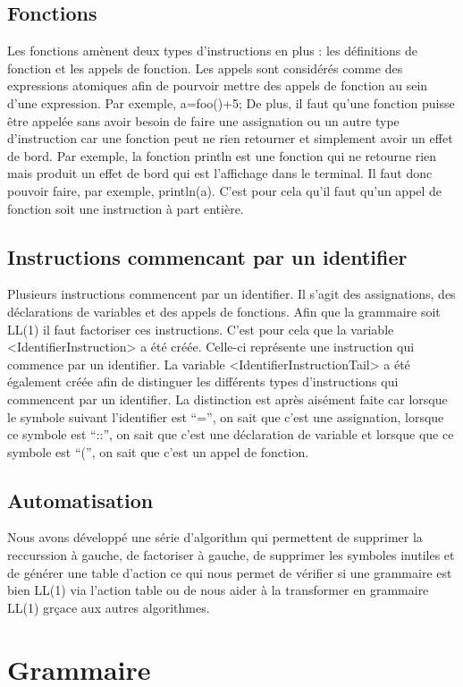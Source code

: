 \documentclass[a4paper,10pt]{article}
\begin{document}
\subsection{Fonctions}
Les fonctions amènent deux types d'instructions en plus : les définitions de fonction et les appels de fonction. Les appels sont considérés comme des expressions atomiques afin de pourvoir mettre des appels de fonction au sein d'une expression. Par exemple, a=foo()+5;
De plus, il faut qu'une fonction puisse être appelée sans avoir besoin de faire une assignation ou un autre type d'instruction car une fonction peut ne rien retourner et simplement avoir un effet de bord. Par exemple, la fonction println est une fonction qui ne retourne rien mais produit un effet de bord qui est l'affichage dans le terminal. Il faut donc pouvoir faire, par exemple, println(a). C'est pour cela qu'il faut qu'un appel de fonction soit une instruction à part entière.
\subsection{Instructions commencant par un identifier}
Plusieurs instructions commencent par un identifier. Il s'agit des assignations, des déclarations de variables et des appels de fonctions. Afin que la grammaire soit LL(1) il faut factoriser ces instructions. C'est pour cela que la variable <IdentifierInstruction> a été créée. Celle-ci représente une instruction qui commence par un identifier. La variable <IdentifierInstructionTail> a été également créée afin de distinguer les différents types d'instructions qui commencent par un identifier. La distinction est après aisément faite car lorsque le symbole suivant l'identifier est ``='', on sait que c'est une assignation, lorsque ce symbole est ``::'', on sait que c'est une déclaration de variable et lorsque que ce symbole est ``('', on sait que c'est un appel de fonction.
\subsection{Automatisation}
Nous avons développé une série d'algorithm qui permettent de supprimer la reccurssion à gauche, de factoriser à gauche, de supprimer les symboles inutiles et de générer une table d'action ce qui nous permet de vérifier si une grammaire est bien LL(1) via l'action table ou de nous aider à la transformer en grammaire LL(1) grçace aux autres algorithmes.


\section{Grammaire}
\end{document}
